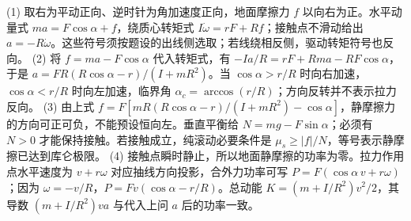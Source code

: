 (1) 取右为平动正向、逆时针为角加速度正向，地面摩擦力 \(f\) 以向右为正。水平动量式 \(ma=F\cos\alpha+f\)，绕质心转矩式 \(I\dot\omega=rF+Rf\)；接触点不滑动给出 \(a=-R\dot\omega\)。这些符号须按题设的出线侧选取；若线绕相反侧，驱动转矩符号也反向。
(2) 将 \(f=ma-F\cos\alpha\) 代入转矩式，有 \(-Ia/R=rF+Rma-RF\cos\alpha\)，于是 \(a=FR(R\cos\alpha-r)/(I+mR^2)\)。当 \(\cos\alpha>r/R\) 时向右加速，\(\cos\alpha<r/R\) 时向左加速，临界角 \(\alpha_c=\arccos(r/R)\)；方向反转并不表示拉力反向。
(3) 由上式 \(f=F[mR(R\cos\alpha-r)/(I+mR^2)-\cos\alpha]\)，静摩擦力的方向可正可负，不能预设恒向左。垂直平衡给 \(N=mg-F\sin\alpha\)；必须有 \(N>0\) 才能保持接触。若接触成立，纯滚动必要条件是 \(\mu_s\ge |f|/N\)，等号表示静摩擦已达到库仑极限。
(4) 接触点瞬时静止，所以地面静摩擦的功率为零。拉力作用点水平速度为 \(v+r\omega\) 对应抽线方向投影，合外力功率可写 \(P=F(\cos\alpha\,v+r\omega)\)；因为 \(\omega=-v/R\)，\(P=Fv(\cos\alpha-r/R)\)。总动能 \(K=(m+I/R^2)v^2/2\)，其导数 \((m+I/R^2)va\) 与代入上问 \(a\) 后的功率一致。
